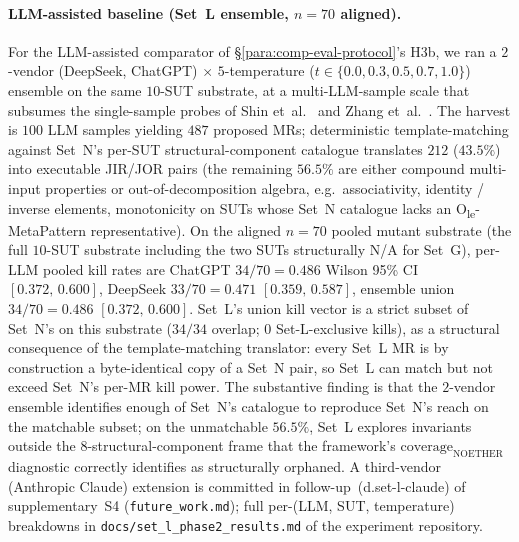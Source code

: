 \documentclass[acmsmall,screen,review]{acmart}
\begin{document}
\paragraph{LLM-assisted baseline (Set~L ensemble, $n = 70$ aligned).}
\label{para:set-l-ensemble}
For the LLM-assisted comparator of \S\ref{para:comp-eval-protocol}'s
H3b, we ran a $2$-vendor (DeepSeek, ChatGPT) $\times$ $5$-temperature
($t \in \{0.0, 0.3, 0.5, 0.7, 1.0\}$) ensemble on the same
$10$-SUT substrate, at a multi-LLM-sample scale that subsumes the
single-sample probes of Shin et~al.~\cite{Shin2024} and
Zhang et~al.~\cite{ZhangChatGPTMR2023}. The harvest is $100$ LLM samples
yielding $487$ proposed MRs; deterministic template-matching against
Set~N's per-SUT structural-component catalogue translates $212$ ($43.5\%$) into
executable JIR/JOR pairs (the remaining $56.5\%$ are either compound
multi-input properties or out-of-decomposition algebra, e.g.\ associativity,
identity / inverse elements, monotonicity on SUTs whose Set~N
catalogue lacks an O\textsubscript{le}-MetaPattern representative). On the
aligned $n = 70$ pooled mutant substrate (the full $10$-SUT
substrate including the two SUTs structurally N/A for Set~G), per-LLM
pooled kill rates are ChatGPT $34/70 = 0.486$ Wilson 95\% CI
$[0.372,\,0.600]$, DeepSeek $33/70 = 0.471$ $[0.359,\,0.587]$,
ensemble union $34/70 = 0.486$ $[0.372,\,0.600]$. Set~L's union kill
vector is a strict subset of Set~N's on this substrate ($34/34$
overlap; $0$ Set-L-exclusive kills), as a structural consequence of
the template-matching translator: every Set~L MR is by construction
a byte-identical copy of a Set~N pair, so Set~L can match but not
exceed Set~N's per-MR kill power. The substantive finding is that
the $2$-vendor ensemble identifies enough of Set~N's catalogue to
reproduce Set~N's reach on the matchable subset; on the unmatchable
$56.5\%$, Set~L explores invariants outside the $8$-structural-component frame that
the framework's $\mathrm{coverage}_{\mathrm{NOETHER}}$ diagnostic
correctly identifies as structurally orphaned. A third-vendor
(Anthropic Claude) extension is committed in
follow-up~(d.set-l-claude) of supplementary~S4 (\texttt{future\_work.md}); full
per-(LLM, SUT, temperature) breakdowns in
\texttt{docs/set\_l\_phase2\_results.md} of the experiment
repository.
\end{document}
